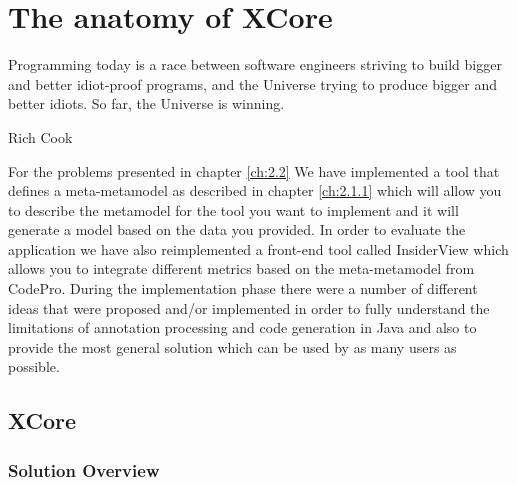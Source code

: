 \chapter{The anatomy of XCore }\label{ch:3}

\epigraph{Programming today is a race between software engineers striving to
build bigger and better idiot-proof programs, and the Universe trying to produce
bigger and better idiots. So far, the Universe is winning.}{Rich Cook}

	For the problems presented in chapter \ref{ch:2.2} We have implemented a tool
that defines a meta-metamodel as described in chapter \ref{ch:2.1.1} which will
allow you to describe the metamodel for the tool you want to implement and it will generate 
a model based on the data you provided. In order to evaluate the application we
have also reimplemented a front-end tool called InsiderView \cite{tools:iPlasma}
which allows you to integrate different metrics based on the meta-metamodel from 
CodePro.
	During the implementation phase there were a number of different ideas
that were proposed and/or implemented in order to fully understand the
limitations of annotation processing and code generation in {J}ava and also to
provide the most general solution which can be used by as many users as
possible.

\section{XCore}

\subsection{Solution Overview}
	 
